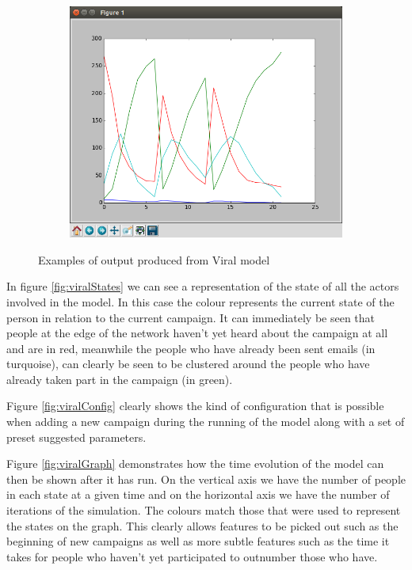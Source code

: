 \documentclass[12pt,a4paper]{article}
\begin{document}
\begin{figure}[htb]
\begin{subfigure}[b]{0.3\linewidth}
	\includegraphics[scale=0.2]{Viral3.png}
	\end{subfigure}
\caption{Examples of output produced from Viral model}
\label{fig:viral}
\end{figure}

In figure \ref{fig:viralStates} we can see a representation of the state of all the actors involved in the model. In this case the colour represents the current state of the person in relation to the current campaign. It can immediately be seen that people at the edge of the network haven't yet heard about the campaign at all and are in red, meanwhile the people who have already been sent emails (in turquoise), can clearly be seen to be clustered around the people who have already taken part in the campaign (in green).

Figure \ref{fig:viralConfig} clearly shows the kind of configuration that is possible when adding a new campaign during the running of the model along with a set of preset suggested parameters.

Figure \ref{fig:viralGraph} demonstrates how the time evolution of the model can then be shown after it has run. On the vertical axis we have the number of people in each state at a given time and on the horizontal axis we have the number of iterations of the simulation. The colours match those that were used to represent the states on the graph. This clearly allows features to be picked out such as the beginning of new campaigns as well as more subtle features such as the time it takes for people who haven't yet participated to outnumber those who have.
\end{document}

